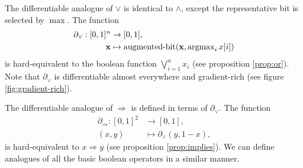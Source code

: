 \documentclass{article} %
\begin{document}
The differentiable analogue of $\vee$ is identical to $\wedge$, except the representative bit is selected by $\operatorname{max}$. The function
\begin{equation*}
\begin{aligned}
\partial_{\vee}: [0,1]^{n} &\to [0,1], \\
{\bf x} &\mapsto \operatorname{augmented-bit}({\bf x}, \operatorname{argmax}\limits_{i} x[i])
\end{aligned}
\end{equation*}
is hard-equivalent to the boolean function $\bigvee_{i=1}^{n} x_i$ (see proposition \ref{prop:or}). Note that $\partial_{\vee}$ is differentiable almost everywhere and gradient-rich (see figure \ref{fig:gradient-rich}).

The differentiable analogue of $\Rightarrow$ is defined in terms of $\partial_{\vee}$. The function
\begin{equation*}
\begin{aligned}
\partial_{\Rightarrow}: [0,1]^{2} &\to [0,1],\\
(x, y) &\mapsto \partial_{\vee}\!(y, 1-x)\text{,}
\end{aligned}
\end{equation*}
is hard-equivalent to $x \Rightarrow y$ (see proposition \ref{prop:implies}). We can define  analogues of all the basic boolean operators in a similar manner.
\end{document}
